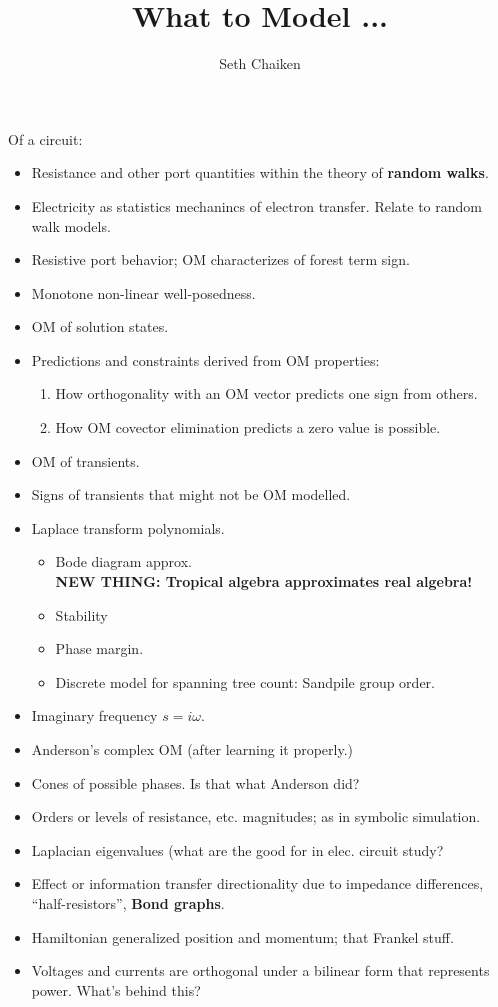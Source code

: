 \documentclass{article}
\title{What to Model ... }
\author{Seth Chaiken}
\begin{document}
\maketitle

Of a circuit:
\begin{itemize}
\item Resistance and other port quantities within the theory of 
\textbf{random walks}\cite{DoyleSnellRandom,ProbOnTreesNetworks}.
\item Electricity as statistics mechanincs of electron transfer.  Relate to 
random walk models.
\item Resistive port behavior; OM characterizes of 
forest term sign.
\item Monotone non-linear well-posedness.
\item OM of solution states.
\item Predictions and constraints derived from OM properties:
\begin{enumerate}
\item How orthogonality with an OM vector predicts one sign from others.
\item How OM covector elimination predicts a zero value is possible.
\end{enumerate}
\item OM of transients.
\item Signs of transients that might not be OM modelled.
\item Laplace transform polynomials.
\begin{itemize}
\item Bode diagram approx.\\
\textbf{NEW THING: Tropical algebra approximates real algebra!}
\item Stability
\item Phase margin.
\item Discrete model for spanning tree count: Sandpile group order.
\end{itemize}

\item Imaginary frequency $s=i\omega$.
\item Anderson's complex OM (after learning it properly.)
\item Cones of possible phases.  Is that what Anderson did?
\item Orders or levels of resistance, etc. magnitudes; as
in symbolic simulation.
\item Laplacian eigenvalues (what are the good for in elec. circuit
study?
\item Effect or information transfer directionality due to impedance
differences, ``half-resistors'',  \textbf{Bond graphs}.
\item Hamiltonian generalized position and momentum; that Frankel stuff.
\item Voltages and currents are orthogonal under a bilinear form that 
represents power.  What's behind this?
\end{itemize}
\end{document}
